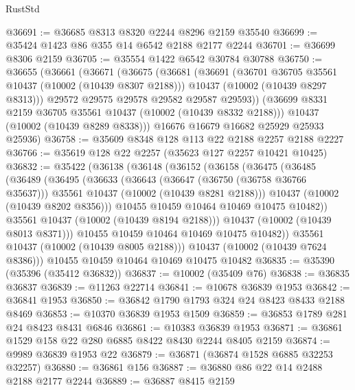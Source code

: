 \begin{lexlean}{RustStd}
\begin{coremodule}
@36691 := @36685 @8313 @8320 @2244 @8296 @2159 @35540
@36699 := @35424 @1423 @86 @355 @14 @6542 @2188 @2177 @2244
@36701 := @36699 @8306 @2159
@36705 := @35554 @1422 @6542 @30784 @30788
@36750 := @36655
    (@36661
      (@36671
        (@36675
          (@36681
            (@36691
              (@36701 @36705 @35561 @10437 (@10002 (@10439 @8307 @2188)))
              @10437
              (@10002 (@10439 @8297 @8313)))
            @29572
            @29575
            @29578
            @29582
            @29587
            @29593))
        (@36699 @8331 @2159 @36705 @35561 @10437 (@10002 (@10439 @8332 @2188)))
        @10437
        (@10002 (@10439 @8289 @8338)))
      @16676
      @16679
      @16682
      @25929
      @25933
      @25936)
@36758 := @35609 @8348 @128 @113 @22 @2188 @2257 @2188 @2227
@36766 := @35619 @128 @22 @2257 (@35623 @127 @2257 @10421 @10425)
@36832 := @35422
    (@36138
      (@36148
        (@36152
          (@36158
            (@36475
              (@36485
                (@36489
                  (@36495
                    (@36633
                      (@36643
                        (@36647 (@36750 (@36758 @36766 @35637)))
                        @35561
                        @10437
                        (@10002 (@10439 @8281 @2188)))
                      @10437
                      (@10002 (@10439 @8202 @8356)))
                    @10455
                    @10459
                    @10464
                    @10469
                    @10475
                    @10482))
                @35561
                @10437
                (@10002 (@10439 @8194 @2188)))
              @10437
              (@10002 (@10439 @8013 @8371)))
            @10455
            @10459
            @10464
            @10469
            @10475
            @10482))
        @35561
        @10437
        (@10002 (@10439 @8005 @2188)))
      @10437
      (@10002 (@10439 @7624 @8386)))
    @10455
    @10459
    @10464
    @10469
    @10475
    @10482
@36835 := @35390 (@35396 (@35412 @36832))
@36837 := @10002 (@35409 @76)
@36838 := @36835 @36837
@36839 := @11263 @22714
@36841 := @10678 @36839 @1953
@36842 := @36841 @1953
@36850 := @36842 @1790 @1793 @324 @24 @8423 @8433 @2188 @8469
@36853 := @10370 @36839 @1953 @1509
@36859 := @36853 @1789 @281 @24 @8423 @8431 @6846
@36861 := @10383 @36839 @1953
@36871 := @36861 @1529 @158 @22 @280 @6885 @8422 @8430 @2244 @8405 @2159
@36874 := @9989 @36839 @1953 @22
@36879 := @36871 (@36874 @1528 @6885 @32253 @32257)
@36880 := @36861 @156
@36887 := @36880 @86 @22 @14 @2488 @2188 @2177 @2244
@36889 := @36887 @8415 @2159

\end{coremodule}
\end{lexlean}
